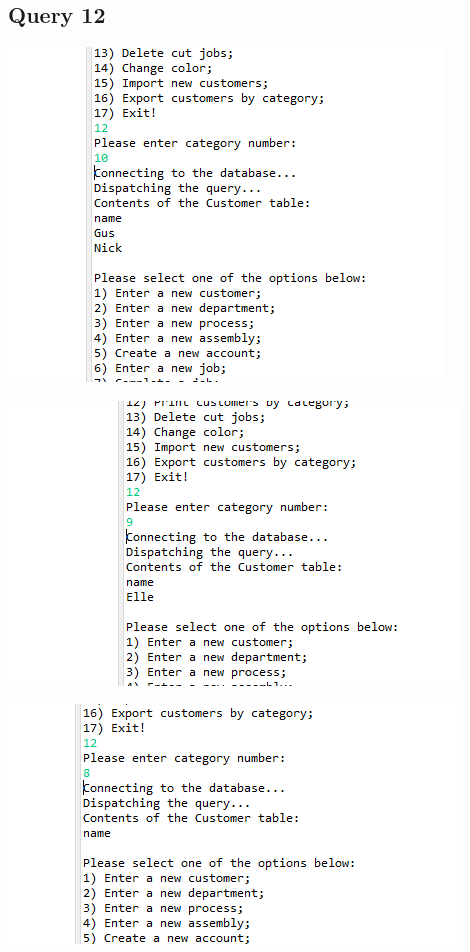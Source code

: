 \documentclass[11pt]{article}
\begin{document}
\subsection{Query 12}
\includegraphics[width = \textwidth]{custByCat1.png}

\includegraphics[width = \textwidth]{custByCat2.png}

\includegraphics[width = \textwidth]{custByCat3.png}
\end{document}
